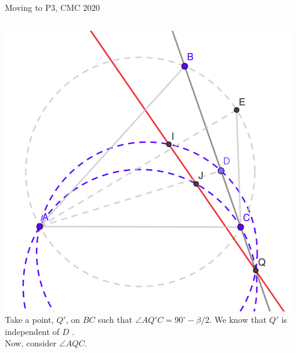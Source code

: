 \documentclass{beamer}
\begin{document}
\begin{frame}{Moving to P3, CMC 2020}
	\begin{columns}
		\includegraphics[scale=0.34]{spi11.png}
		Take a point, $Q'$, on $BC$ such that $\angle AQ'C = 
		90^\circ - \beta/2$. We know that $Q'$ is independent of $D$
		.\\
		\phantom{Spacing}
		Now, consider $\angle AQC$.
	\end{columns}
\end{frame}
\end{document}

